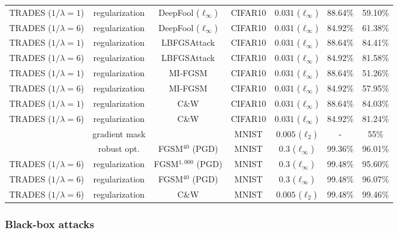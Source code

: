 \documentclass[11pt]{article}
\newcommand{\0}{\mathbf{0}}
\newcommand{\1}{\mathbf{1}}
\begin{document}
\begin{table*}
\begin{tabular}{c||c|c|c|c|c|c}
{TRADES} ($1/\lambda=1$) & regularization & DeepFool ($\ell_\infty$) & CIFAR10 &  $0.031$ ($\ell_\infty$) & 88.64\% & 59.10\% \\
{TRADES} ($1/\lambda=6$) & regularization & DeepFool ($\ell_\infty$) & CIFAR10 &  $0.031$ ($\ell_\infty$) & 84.92\% & 61.38\% \\
		{TRADES} ($1/\lambda=1$) & regularization & LBFGSAttack  & CIFAR10 &  $0.031$ ($\ell_\infty$) & 88.64\% & 84.41\% \\
		{TRADES} ($1/\lambda=6$) & regularization & LBFGSAttack  & CIFAR10 &  $0.031$ ($\ell_\infty$) & 84.92\% & 81.58\% \\
		{TRADES} ($1/\lambda=1$) & regularization & MI-FGSM  & CIFAR10 &  $0.031$ ($\ell_\infty$) & 88.64\% & 51.26\% \\
		{TRADES} ($1/\lambda=6$) & regularization & MI-FGSM & CIFAR10 &  $0.031$ ($\ell_\infty$) & 84.92\% & 57.95\% \\
		{TRADES} ($1/\lambda=1$) & regularization & C\&W & CIFAR10 &  $0.031$ ($\ell_\infty$) & 88.64\% & 84.03\% \\
		{TRADES} ($1/\lambda=6$) & regularization & C\&W & CIFAR10 &  $0.031$ ($\ell_\infty$) & 84.92\% & 81.24\% \\
		\hline
		\cite{samangouei2018defense} & gradient mask & \cite{athalye2018obfuscated} & MNIST & $0.005$ ($\ell_2$) & - & 55\% \\
		\cite{madry2018towards} & robust opt. & FGSM$^{40}$ (PGD) & MNIST & $0.3$ ($\ell_\infty$) & 99.36\% & 96.01\% \\
		{TRADES} ($1/\lambda=6$) & regularization & FGSM$^{1,000}$ (PGD) & MNIST &  $0.3$ ($\ell_\infty$) & 99.48\% & 95.60\% \\
		{TRADES} ($1/\lambda=6$) & regularization & FGSM$^{40}$ (PGD) & MNIST &  $0.3$ ($\ell_\infty$) & 99.48\% & 96.07\% \\
		{TRADES} ($1/\lambda=6$) & regularization & C\&W & MNIST &  $0.005$ ($\ell_2$) & 99.48\% & 99.46\% \\
		\hline
	\end{tabular}
\end{table*}

\vspace{-0.2cm}
\subsubsection{Black-box attacks}\label{subsec:black-box}
\end{document}
